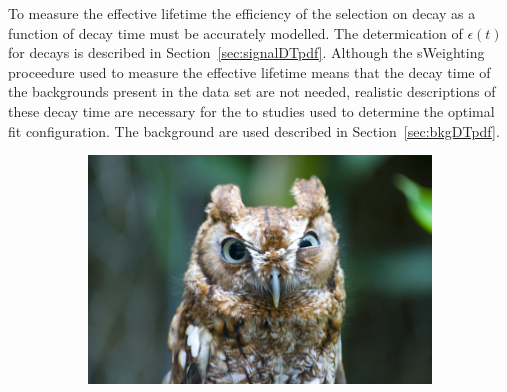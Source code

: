 To measure the \bsmumu effective lifetime the efficiency of the selection on \bsmumu decay as a function of decay time must be accurately modelled. The determication of $\epsilon(t)$ for \bsmumu decays is described in Section~\ref{sec:signalDTpdf}. Although the sWeighting proceedure used to measure the \bsmumu effective lifetime means that the decay time \pdfs of the backgrounds present in the data set are not needed, realistic  descriptions of these decay time \pdfs are necessary for the to studies used to determine the optimal fit configuration. The background \pdfs are used described in Section~\ref{sec:bkgDTpdf}.

\begin{figure}[htbp]
    \centering
   \begin{subfigure}[b]{0.48\textwidth}
        \includegraphics[width= \textwidth]{./Figs/placeholder.jpeg}
    \end{subfigure}
   ~ %
    \begin{subfigure}[b]{0.48\textwidth}

\end{subfigure}
\end{figure}
